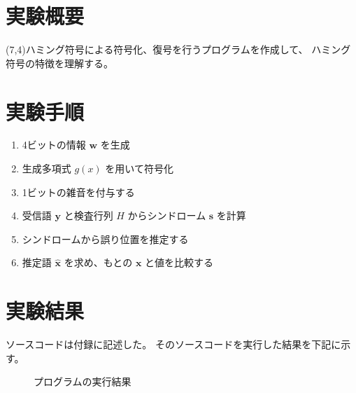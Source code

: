 \documentclass[12pt]{jarticle}
\begin{document}



\section{実験概要}
 (7,4)ハミング符号による符号化、復号を行うプログラムを作成して、
ハミング符号の特徴を理解する。

\section{実験手順}
\begin{enumerate}
    \item 4ビットの情報 $\boldsymbol{w}$ を生成
    \item 生成多項式 $g(x)$ を用いて符号化
    \item 1ビットの雑音を付与する
    \item 受信語 $\boldsymbol{y}$ と検査行列 $H$ からシンドローム $\boldsymbol{s}$ を計算
    \item シンドロームから誤り位置を推定する
    \item 推定語 $\hat{\boldsymbol{x}}$ を求め、もとの $\boldsymbol{x}$ と値を比較する
\end{enumerate}

\section{実験結果}

ソースコードは付録に記述した。
そのソースコードを実行した結果を下記に示す。

\begin{figure}[h]
    \begin{center}
    \end{center}
    \caption{プログラムの実行結果}
\end{figure}
\clearpage
\end{document}
